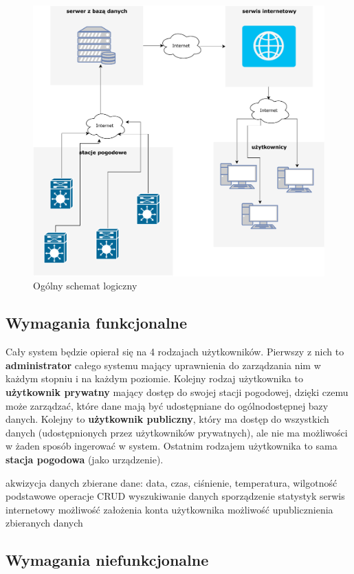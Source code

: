 \documentclass{article}
\begin{document}
    \begin{figure}[h]
        \centering
        \includegraphics[width=0.5\linewidth]{ogolne.pdf}
        \caption{Ogólny schemat logiczny}
        \label{fig:schemat}
    \end{figure}
\newpage
\subsection{Wymagania funkcjonalne}
    
Cały system będzie opierał się na 4 rodzajach użytkowników. Pierwszy z nich to \textbf{administrator} całego systemu mający uprawnienia do zarządzania nim w każdym stopniu i na każdym poziomie. Kolejny rodzaj użytkownika to \textbf{użytkownik prywatny} mający dostęp do swojej stacji pogodowej, dzięki czemu może zarządzać, które dane mają być udostępniane do ogólnodostępnej bazy danych. Kolejny to \textbf{użytkownik publiczny}, który ma dostęp do wszystkich danych (udostępnionych przez użytkowników prywatnych), ale nie ma możliwości w żaden sposób ingerować w system. Ostatnim rodzajem użytkownika to sama \textbf{stacja pogodowa} (jako urządzenie).
    \begin{outline}
        \1 akwizycja danych 
            \2 zbierane dane: data, czas, ciśnienie, temperatura, wilgotność
            \2 podstawowe operacje CRUD
            \2 wyszukiwanie danych
            \2 sporządzenie statystyk
        \1 serwis internetowy
            \2 możliwość założenia konta użytkownika
            \2 możliwość upublicznienia zbieranych danych
    \end{outline}
\subsection{Wymagania niefunkcjonalne}
\end{document}
